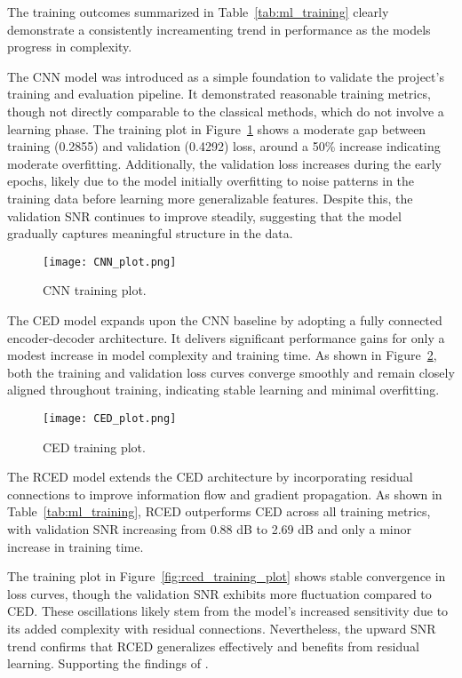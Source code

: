 The training outcomes summarized in Table~\ref{tab:ml_training} clearly demonstrate a consistently increamenting trend in performance as the models progress in complexity. 

The CNN model was introduced as a simple foundation to validate the project’s training and evaluation pipeline. It demonstrated reasonable training metrics, though not directly comparable to the classical methods, which do not involve a learning phase. The training plot in Figure~\ref{fig:cnn_training_plot} shows a moderate gap between training (0.2855) and validation (0.4292) loss, around a 50\% increase indicating moderate overfitting. Additionally, the validation loss increases during the early epochs, likely due to the model initially overfitting to noise patterns in the training data before learning more generalizable features. Despite this, the validation SNR continues to improve steadily, suggesting that the model gradually captures meaningful structure in the data.

\begin{figure}[H]
    \centering
    \texttt{[image: CNN\_plot.png]}
    \caption{\label{fig:cnn_training_plot} CNN training plot.}
\end{figure}

The CED model expands upon the CNN baseline by adopting a fully connected encoder-decoder architecture. It delivers significant performance gains for only a modest increase in model complexity and training time. As shown in Figure~\ref{fig:ced_training_plot}, both the training and validation loss curves converge smoothly and remain closely aligned throughout training, indicating stable learning and minimal overfitting.

\begin{figure}[H]
    \centering
    \texttt{[image: CED\_plot.png]}
    \caption{\label{fig:ced_training_plot} CED training plot.}
\end{figure}

The RCED model extends the CED architecture by incorporating residual connections to improve information flow and gradient propagation. As shown in Table~\ref{tab:ml_training}, RCED outperforms CED across all training metrics, with validation SNR increasing from 0.88 dB to 2.69 dB and only a minor increase in training time.

The training plot in Figure~\ref{fig:rced_training_plot} shows stable convergence in loss curves, though the validation SNR exhibits more fluctuation compared to CED. These oscillations likely stem from the model’s increased sensitivity due to its added complexity with residual connections. Nevertheless, the upward SNR trend confirms that RCED generalizes effectively and benefits from residual learning. Supporting the findings of \cite{park2017acoustic}.

